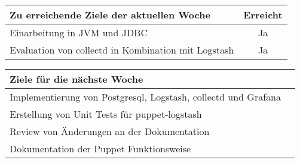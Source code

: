 \begin{tabularx}{\textwidth}{Xc}
    \arrayrulecolor{OliveGreen}
    \toprule
    {\bfseries Zu erreichende Ziele der aktuellen Woche} & {\bfseries Erreicht} \\
    \midrule[2pt]
    Einarbeitung in JVM und JDBC                         &Ja                    \\
    \rowcolor{OliveGreen!15}
    Evaluation von collectd in Kombination mit Logstash  &Ja                    \\
    \bottomrule[2pt]
\end{tabularx}
%
\vspace{1cm}
%
\begin{tabularx}{\textwidth}{Xc}
    \arrayrulecolor{OliveGreen}
    \toprule
    {\bfseries Ziele für die nächste Woche}              &                      \\
    \midrule[2pt]
    Implementierung von Postgresql, Logstash, collectd und Grafana &            \\
    \rowcolor{OliveGreen!15}
    Erstellung von Unit Tests für puppet-logstash        &                      \\
    \rowcolor{White}
    Review von Änderungen an der Dokumentation           &                      \\
    \rowcolor{OliveGreen!15}
    Dokumentation der Puppet Funktionsweise              &                      \\
\end{tabularx}
